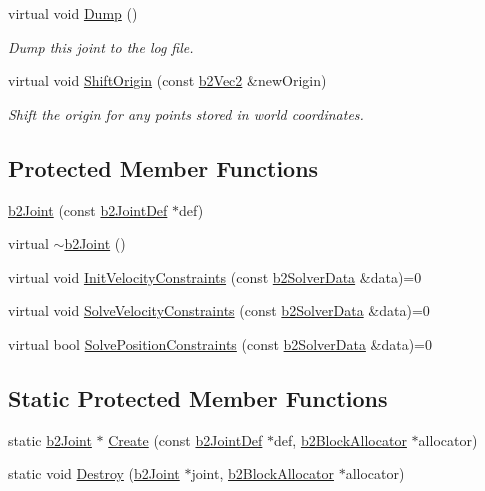 \begin{DoxyCompactItemize}
\item 
virtual void \mbox{\hyperlink{classb2_joint_abd35e7316017ad9a40d5dbf9b5ba3f36}{Dump}} ()
\begin{DoxyCompactList}\small\item\em Dump this joint to the log file. \end{DoxyCompactList}\item 
virtual void \mbox{\hyperlink{classb2_joint_a7804f649e993dc0fd9ae47fde5601f90}{Shift\+Origin}} (const \mbox{\hyperlink{structb2_vec2}{b2\+Vec2}} \&new\+Origin)
\begin{DoxyCompactList}\small\item\em Shift the origin for any points stored in world coordinates. \end{DoxyCompactList}\end{DoxyCompactItemize}
\subsection*{Protected Member Functions}
\begin{DoxyCompactItemize}
\item 
\mbox{\hyperlink{classb2_joint_a8d6cce91546335fe95325d5e29c06a19}{b2\+Joint}} (const \mbox{\hyperlink{structb2_joint_def}{b2\+Joint\+Def}} $\ast$def)
\item 
virtual \mbox{\hyperlink{classb2_joint_ab44cde7b81c3e77540400e0da90d6ceb}{$\sim$b2\+Joint}} ()
\item 
virtual void \mbox{\hyperlink{classb2_joint_a599c013de5514e02684b958b31dd76a4}{Init\+Velocity\+Constraints}} (const \mbox{\hyperlink{structb2_solver_data}{b2\+Solver\+Data}} \&data)=0
\item 
virtual void \mbox{\hyperlink{classb2_joint_ad302c8d02efcfe934158de0dc429348d}{Solve\+Velocity\+Constraints}} (const \mbox{\hyperlink{structb2_solver_data}{b2\+Solver\+Data}} \&data)=0
\item 
virtual bool \mbox{\hyperlink{classb2_joint_af767ac9aa494bd15cdf83dfe3e487d9c}{Solve\+Position\+Constraints}} (const \mbox{\hyperlink{structb2_solver_data}{b2\+Solver\+Data}} \&data)=0
\end{DoxyCompactItemize}
\subsection*{Static Protected Member Functions}
\begin{DoxyCompactItemize}
\item 
static \mbox{\hyperlink{classb2_joint}{b2\+Joint}} $\ast$ \mbox{\hyperlink{classb2_joint_a2e500c93107d0bf6b0a21654528faeab}{Create}} (const \mbox{\hyperlink{structb2_joint_def}{b2\+Joint\+Def}} $\ast$def, \mbox{\hyperlink{classb2_block_allocator}{b2\+Block\+Allocator}} $\ast$allocator)
\item 
static void \mbox{\hyperlink{classb2_joint_acf52946b6672d77f268b849ccb09e003}{Destroy}} (\mbox{\hyperlink{classb2_joint}{b2\+Joint}} $\ast$joint, \mbox{\hyperlink{classb2_block_allocator}{b2\+Block\+Allocator}} $\ast$allocator)
\end{DoxyCompactItemize}
